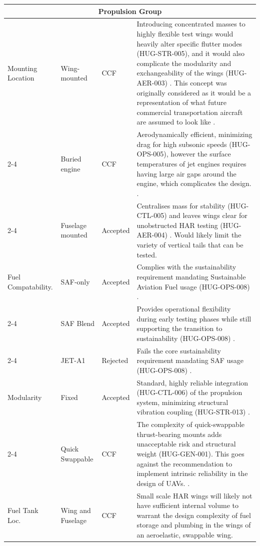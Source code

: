 \begin{longtable}{|p{1.6cm}|p{2.3cm}|p{1.6cm}|p{9.5cm}|}
\multicolumn{4}{|c|}{\textbf{Propulsion Group}} \\
\hline
Mounting Location & Wing-mounted & CCF & Introducing concentrated masses to highly flexible test wings would heavily alter specific flutter modes (HUG-STR-005), and it would also complicate the modularity and exchangeability of the wings (HUG-AER-003) \cite{livne}. This concept was originally considered as it would be a  representation of what future commercial transportation aircraft are assumed to look like \cite{Aerodynamic_Analysis}. \\
\cline{2-4}
\multicolumn{1}{|l|}{} & Buried engine & CCF & Aerodynamically efficient, minimizing drag for high subsonic speeds (HUG-OPS-005), however the surface temperatures of jet engines requires having large air gaps around the engine, which complicates the design. \cite{raymer1992aircraft, Shorter2021MicroTurbine}. \\
\cline{2-4}
\multicolumn{1}{|l|}{} & Fuselage mounted & Accepted & Centralises mass for stability (HUG-CTL-005) and leaves wings clear for unobstructed HAR testing (HUG-AER-004) \cite{Vos}. Would likely limit the variety of vertical tails that can be tested.\\
\hline
Fuel Compatability. & SAF-only & Accepted & Complies with the sustainability requirement mandating Sustainable Aviation Fuel usage (HUG-OPS-008) \cite{Wang2024}. \\
\cline{2-4}
\multicolumn{1}{|l|}{} & SAF Blend & Accepted & Provides operational flexibility during early testing phases while still supporting the transition to sustainability (HUG-OPS-008) \cite{Jarin2024, Kumar2025}. \\
\cline{2-4}
\multicolumn{1}{|l|}{} & JET-A1 & Rejected & Fails the core sustainability requirement mandating SAF usage (HUG-OPS-008) \cite{Wang2024}. \\
\hline
Modularity & Fixed & Accepted & Standard, highly reliable integration (HUG-CTL-006) of the propulsion system, minimizing structural vibration coupling (HUG-STR-013) \cite{Prakash2016DynamicFoundation, Alhazmi2025CoolingFanVibration}. \\
\cline{2-4}
\multicolumn{1}{|l|}{} & Quick Swappable & CCF & The complexity of quick-swappable thrust-bearing mounts adds unacceptable risk and structural weight (HUG-GEN-001). This goes against the recommendation to implement intrinsic reliability in the design of UAVs. \cite{Reliability_Unmanned_Aerial_Vehicles}. \\
\hline
Fuel Tank Loc. & Wing and Fuselage & CCF & Small scale HAR wings will likely not have sufficient internal volume to warrant the design complexity of fuel storage and plumbing in the wings of an aeroelastic, swappable wing. \\

\end{longtable}
